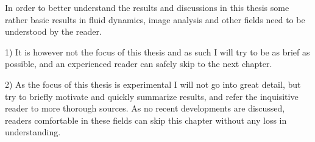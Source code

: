 In order to better understand the results and discussions in this thesis some rather basic results in fluid dynamics, image analysis and other fields need to be understood by the reader. 

1)
It is however not the focus of this thesis and as such I will try to be as brief as possible, and an experienced reader can safely skip to the next chapter.

2)
As the focus of this thesis is experimental I will not go into great detail, but try to briefly motivate and quickly summarize results, and refer the inquisitive reader to more thorough sources. As no recent developments are discussed, readers comfortable in these fields can skip this chapter without any loss in understanding.